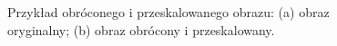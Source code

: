 \begin{figure}[!ht]
 \begin{center}
 \end{center}
 \caption{
  Przykład obróconego i przeskalowanego obrazu:
  (a) obraz oryginalny;
  (b) obraz obrócony i przeskalowany.
 }
 \label{fig:spaceGraphics_orientation}
\end{figure}